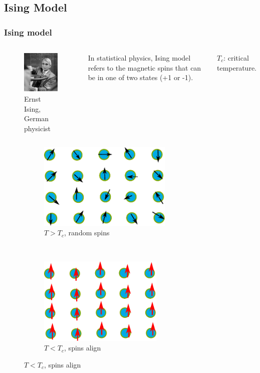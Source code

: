 \documentclass[notheorems]{beamer}
\begin{document}
\subsection{Ising Model}
\begin{frame}
\frametitle{Ising model}
	\begin{columns}
		\column{5cm}
		\begin{figure}
			\includegraphics[width=3cm]{ernst_ising.jpeg}
			\caption{Ernst Ising, German physicist}
		\end{figure}
		\column{5cm}
	In statistical physics, Ising model refers to the magnetic spins that can be in one of two states (+1 or -1).
	
	$T_c$: critical temperature.
	
	\end{columns}
\begin{figure}
	\centering
	\begin{subfigure}{0.4\textwidth}
		\includegraphics[width=0.7\textwidth]{Tlarge.pdf}
		\caption{$T>T_c$, random spins}
	\end{subfigure}~
	\begin{subfigure}{0.4\textwidth}
		\includegraphics[width=0.65\textwidth]{Tsmall.pdf}
		\caption{$T<T_c$, spins align}
	\end{subfigure}
\end{figure}
\end{frame}
\end{document}
